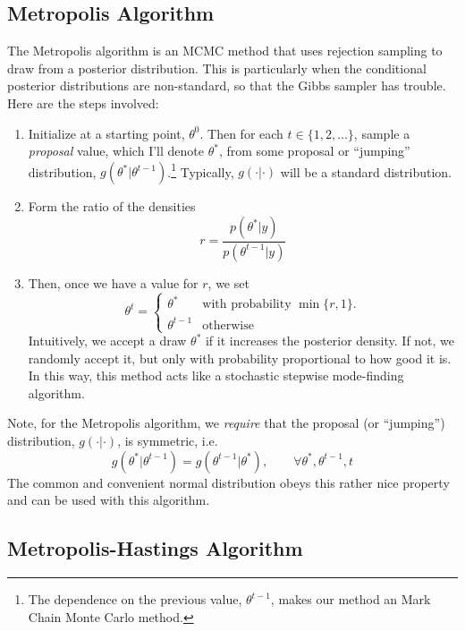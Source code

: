 \documentclass[12pt]{article}
\begin{document}
\newpage
\subsection{Metropolis Algorithm}

The Metropolis algorithm is an MCMC method that uses rejection 
sampling to draw from a posterior distribution. This is particularly
when the conditional posterior distributions are non-standard, so
that the Gibbs sampler has trouble. Here are the steps involved:
\begin{enumerate}
   \item Initialize at a starting point, $\theta^0$. 
      Then for each $t \in \{1, 2, \ldots\}$, 
      sample a \emph{proposal} value, which I'll denote 
      $\theta^*$, from some proposal or ``jumping'' distribution,
      $g(\theta^* | \theta^{t-1})$.\footnote{The
      dependence on the previous value, $\theta^{t-1}$, makes
      our method an Mark Chain Monte Carlo method.} 
      Typically, $g(\cdot | \cdot)$ will be a standard distribution.
   \item Form the ratio of the densities 
      \begin{equation}
	 \label{metalg}
	 r = \frac{p(\theta^* | y)}{p(\theta^{t-1} | y)} 
      \end{equation}
   \item Then, once we have a value for $r$, we set
      \begin{equation}
	 \label{accept}
	  \theta^t = \begin{cases} \theta^* & \text{with probability
	    $\min\{r,1\}$.} \\ \theta^{t-1} & \text{otherwise}
	 \end{cases}
      \end{equation}
      Intuitively, we accept a draw $\theta^*$ if it increases 
      the posterior density. If not, we randomly accept
      it, but only with probability proportional to how good it is.
      In this way, this method acts like a stochastic 
      stepwise mode-finding algorithm.
\end{enumerate}
Note, for the Metropolis algorithm, we \emph{require} that the 
proposal (or ``jumping'') distribution, $g(\cdot | \cdot)$, is 
symmetric, i.e.
\[ g(\theta^* | \theta^{t-1}) = g( \theta^{t-1} |\theta^* ), 
   \qquad \forall \theta^*, \theta^{t-1}, t  \]
The common and convenient normal distribution obeys this rather nice
property and can be used with this algorithm.

\subsection{Metropolis-Hastings Algorithm}
\end{document}
